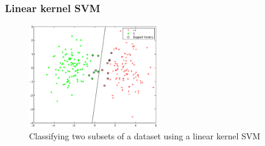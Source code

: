 \documentclass{beamer}
\begin{document}
    \begin{frame}
        \frametitle{Linear kernel SVM}
        \begin{figure}
            \centering
            \includegraphics[width=0.5\textwidth]{figures/svm_linear_classification.eps}
            \caption{Classifying two subsets of a dataset using a linear kernel SVM}
        \end{figure}
    \end{frame}
    
\end{document}
